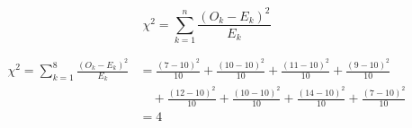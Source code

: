 \documentclass[a4paper,11pt,openright]{report}
\begin{document}
\begin{enumerate}
\begin{equation*}
\chi^2  = \sum_{k=1}^{n} \frac{(O_k - E_k)^2}{E_k}
\end{equation*}

\begin{equation*}
\begin{split}
\chi^2 = \sum_{k=1}^{8} \frac{(O_k - E_k)^2}{E_k} & = \frac{(7 - 10)^2}{10} + \frac{(10 - 10)^2}{10} + \frac{(11 - 10)^2}{10} + \frac{(9 - 10)^2}{10} \\
&\quad + \frac{(12 - 10)^2}{10} + \frac{(10 - 10)^2}{10} + \frac{(14 - 10)^2}{10} + \frac{(7 - 10)^2}{10} \\
& = 4
\end{split}
\end{equation*}

\end{enumerate}
\end{document}

